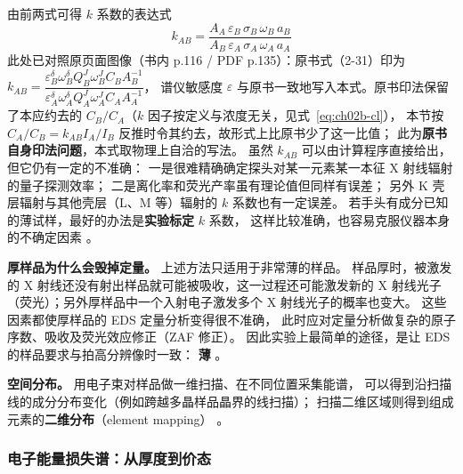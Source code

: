 \begin{principle}
由前两式可得 $k$ 系数的表达式
\begin{equation}
k_{AB}=\frac{A_A\,\varepsilon_B\,\sigma_B\,\omega_B\,a_B}{A_B\,\varepsilon_A\,\sigma_A\,\omega_A\,a_A}
\label{eq:ch02b-kfac}
\end{equation}
此处已对照原页面图像（书内 p.116 / PDF p.135）：原书式（2-31）印为
$k_{AB}=\dfrac{\varepsilon_B^{\delta}\omega_B^{\delta}Q_B^{J}\omega_B^{J}C_BA_B^{-1}}{\varepsilon_A^{\delta}\omega_A^{\delta}Q_A^{J}\omega_A^{J}C_AA_A^{-1}}$，
谱仪敏感度 $\varepsilon$ 与原书一致地写入本式。原书印法保留了本应约去的
$C_B/C_A$（$k$ 因子按定义与浓度无关，见式~\eqref{eq:ch02b-cl}），
本节按 $C_A/C_B=k_{AB}I_A/I_B$ 反推时令其约去，故形式上比原书少了这一比值；
此为\textbf{原书自身印法问题}，本式取物理上自洽的写法。
虽然 $k_{AB}$ 可以由计算程序直接给出，但它仍有一定的不准确：
一是很难精确确定探头对某一元素某一本征 X 射线辐射的量子探测效率；
二是离化率和荧光产率虽有理论值但同样有误差；
另外 K 壳层辐射与其他壳层（L、M 等）辐射的 $k$ 系数也有一定误差。
若手头有成分已知的薄试样，最好的办法是\textbf{实验标定} $k$ 系数，
这样比较准确，也容易克服仪器本身的不确定因素
。

\textbf{厚样品为什么会毁掉定量。} 上述方法只适用于非常薄的样品。
样品厚时，被激发的 X 射线还没有射出样品就可能被吸收，这一过程还可能激发新的
X 射线光子（荧光）；另外厚样品中一个入射电子激发多个 X 射线光子的概率也变大。
这些因素都使厚样品的 EDS 定量分析变得很不准确，
此时应对定量分析做复杂的原子序数、吸收及荧光效应修正（ZAF 修正）。
因此实验上最简单的途径，是让 EDS 的样品要求与拍高分辨像时一致：
\textbf{薄} 。

\textbf{空间分布。} 用电子束对样品做一维扫描、在不同位置采集能谱，
可以得到沿扫描线的成分分布变化（例如跨越多晶样品晶界的线扫描）；
扫描二维区域则得到组成元素的\textbf{二维分布}（element mapping）
。
\end{principle}
\subsubsection{电子能量损失谱：从厚度到价态}

